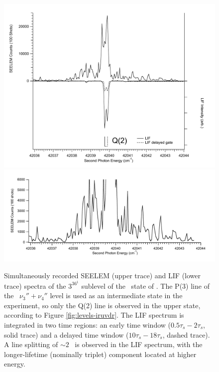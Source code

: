 \documentclass[12pt]{mitthesis}
\begin{document}
\begin{figure}
  \caption{Simultaneously recorded SEELEM (upper trace) and LIF (lower
    trace) spectra of the $3^36^1$  sublevel of the \astate\
    state of .  The P(3) line of the \xstate\ $\nu_3'' +
    \nu_4''$ level is used as an intermediate state in the experiment,
    so only the Q(2) line is observed in the upper state, according to
    Figure \ref{fig:levels-iruvdr}.  The LIF spectrum is integrated in
    two time regions: an early time window ($0.5\tau_s-2\tau_s$, solid
    trace) and a delayed time window ($10\tau_s-18\tau_s$, dashed
    trace).  A line splitting of $\sim 2$ \rcm\ is observed in the LIF
    spectrum, with the longer-lifetime (nominally triplet) component
    located at higher energy.}
  \label{fig:3361-q2}
  \centering
  \includegraphics[width=6in]{spectrum-3361-q2-split.pdf}
  \includegraphics[width=6in]{spectrum-3361-q2-zoom.pdf}
\end{figure}
\end{document}
